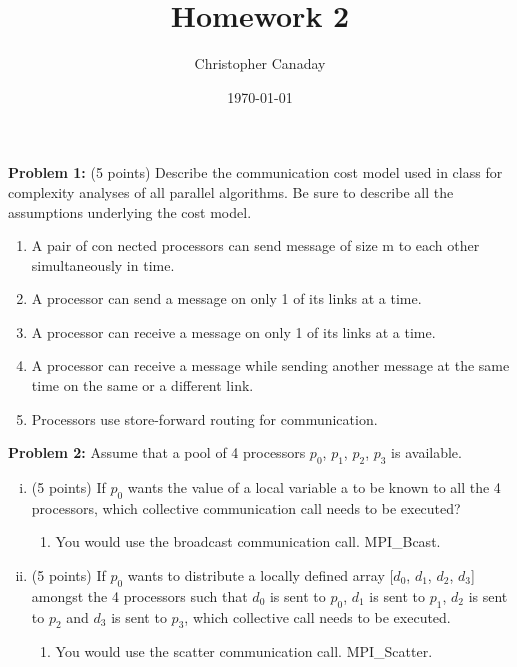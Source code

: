 \documentclass{article}
\title{Homework 2}
\author{Christopher Canaday}
\date{\today}
\begin{document}
    \maketitle
    \textbf{Problem 1:} (5 points) Describe the communication cost model used in class for complexity analyses of all
    parallel algorithms. Be sure to describe all the assumptions underlying the cost model.
    \begin{enumerate}
        \item A pair of con nected processors can send message of size m to each other simultaneously in time.
        \item A processor can send a message on only 1 of its links at a time.
        \item A processor can receive a message on only 1 of its links at a time.
        \item A processor can receive a message while sending another message at the same time on the same or a different link.
        \item Processors use store-forward routing for communication.
    \end{enumerate}

    \textbf{Problem 2:} Assume that a pool of 4 processors {$p_{0}$, $p_{1}$, $p_{2}$, $p_{3}$} is available.
    \begin{enumerate}[i.]
    \item (5 points) If $p_{0}$ wants the value of a local variable a to be known to all the 4 processors, which collective
    communication call needs to be executed?
    \begin{enumerate}
        \item You would use the broadcast communication call. MPI\_Bcast.
    \end{enumerate}

    \item (5 points) If $p_{0}$ wants to distribute a locally defined array [$d_{0}$, $d_{1}$, $d_{2}$, $d_{3}$] amongst the 4 processors such
that $d_{0}$ is sent to $p_{0}$, $d_{1}$ is sent to $p_{1}$, $d_{2}$ is sent to $p_{2}$ and $d_{3}$ is sent to $p_{3}$, which collective call needs to be
executed.
    \begin{enumerate}
        \item You would use the scatter communication call. MPI\_Scatter.
    \end{enumerate}
    \end{enumerate}
    
\end{document}

